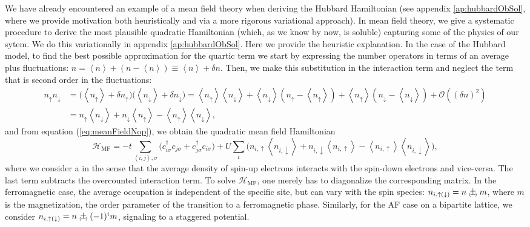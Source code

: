 We have already encountered an example of a mean field theory when deriving the Hubbard Hamiltonian (see appendix \ref{ap:hubbardObSol}, where we provide motivation both heuristically and via a more rigorous variational approach).
In mean field theory, we give a systematic procedure to derive the most plausible quadratic Hamiltonian (which, as we know by now, is soluble) capturing some of the physics of our sytem.
We do this variationally in appendix \ref{ap:hubbardObSol}.
Here we provide the heuristic explanation.
In the case of the Hubbard model, to find the best possible approximation for the quartic term we start by expressing the number operators in terms of an average plus fluctuations: $n = \left\langle n \right\rangle + ( n - \left\langle n \right\rangle ) \equiv \left\langle n \right\rangle + \delta n$.
Then, we make this substitution in the interaction term and neglect the term that is second order in the fluctuations:
\begin{equation}\label{eq:meanFieldNop}
\begin{split}
n_\uparrow n_\downarrow &= \big( \left\langle n_\uparrow \right\rangle +  \delta n_\uparrow  \big) \big( \left\langle n_\downarrow \right\rangle +  \delta n_\downarrow  \big) = \left\langle n_\uparrow \right\rangle \left\langle n_\downarrow \right\rangle + \left\langle n_\downarrow \right\rangle ( n_\uparrow - \left\langle n_\uparrow \right\rangle ) + \left\langle n_\uparrow \right\rangle ( n_\downarrow - \left\langle n_\downarrow \right\rangle ) + \mathcal{O}((\delta n)^2) \\
&= n_\uparrow \left\langle n_\downarrow \right\rangle + n_\downarrow \left\langle n_\uparrow \right\rangle - \left\langle n_\uparrow \right\rangle \left\langle n_\downarrow \right\rangle ,
\end{split}
\end{equation}
and from equation (\ref{eq:meanFieldNop}), we obtain the quadratic mean field Hamiltonian
\begin{equation}
\mathcal{H}_{\text{MF}} = - t \sum_{\left\langle i, j \right\rangle, \sigma} \bigg( c_{i\sigma}^\dagger c_{j\sigma} + c_{j\sigma}^\dagger c_{i\sigma} \bigg) + U \sum_i \bigg( n_{i,\uparrow} \left\langle n_{i, \downarrow} \right\rangle + n_{i, \downarrow} \left\langle n_{i, \uparrow} \right\rangle - \left\langle n_{i, \uparrow} \right\rangle \left\langle n_{i, \downarrow} \right\rangle \bigg) ,
\end{equation}
where we consider a  in the sense that the average density of spin-up electrons interacts with the spin-down electrons and vice-versa.
The last term subtracts the overcounted  interaction term.
To solve $\mathcal{H}_{\text{MF}}$, one merely has to diagonalize the corresponding matrix.
In the ferromagnetic case, the average occupation is independent of the specific site, but can vary with the spin species: $n_{i, \uparrow(\downarrow)} = n \Pm m$, where $m$ is the magnetization, the order parameter of the transition to a ferromagnetic phase.
Similarly, for the \acs{AF} case on a bipartite lattice, we consider $n_{i, \uparrow(\downarrow)} = n \Pm (-1)^{i} m$, signaling to a staggered potential.

